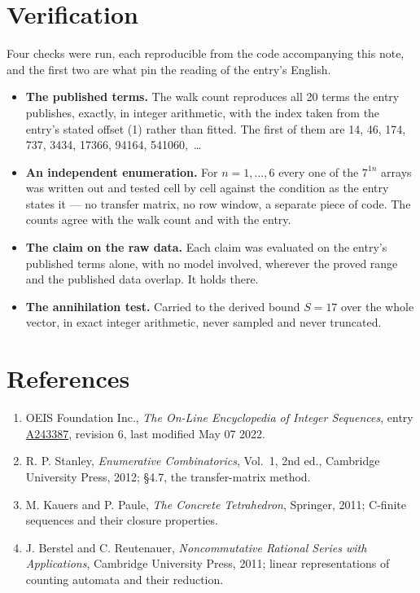 \documentclass[11pt]{article}
\theoremstyle{definition}
\begin{document}
\section{Verification}

Four checks were run, each reproducible from the code accompanying this note, and the first two are what pin the reading of the entry's English.

\begin{itemize}

\item {\bfseries The published terms.} The walk count reproduces all 20 terms the entry publishes, exactly, in integer arithmetic, with the index taken from the entry's stated offset (1) rather than fitted. The first of them are 14, 46, 174, 737, 3434, 17366, 94164, 541060,~\dots

\item {\bfseries An independent enumeration.} For $n = 1,\dots,6$ every one of the $7^{1n}$ arrays was written out and tested cell by cell against the condition as the entry states it --- no transfer matrix, no row window, a separate piece of code. The counts agree with the walk count and with the entry.

\item {\bfseries The claim on the raw data.} Each claim was evaluated on the entry's published terms alone, with no model involved, wherever the proved range and the published data overlap. It holds there.

\item {\bfseries The annihilation test.} Carried to the derived bound $S = 17$ over the whole vector, in exact integer arithmetic, never sampled and never truncated.

\end{itemize}

\section{References}

\begin{enumerate}

\item OEIS Foundation Inc., \emph{The On-Line Encyclopedia of Integer Sequences}, entry \href{https://oeis.org/A243387}{A243387}, revision 6, last modified May 07 2022.

\item R. P. Stanley, \emph{Enumerative Combinatorics}, Vol.~1, 2nd ed., Cambridge University Press, 2012; \S4.7, the transfer-matrix method.

\item M. Kauers and P. Paule, \emph{The Concrete Tetrahedron}, Springer, 2011; C-finite sequences and their closure properties.

\item J. Berstel and C. Reutenauer, \emph{Noncommutative Rational Series with Applications}, Cambridge University Press, 2011; linear representations of counting automata and their reduction.

\end{enumerate}
\end{document}
